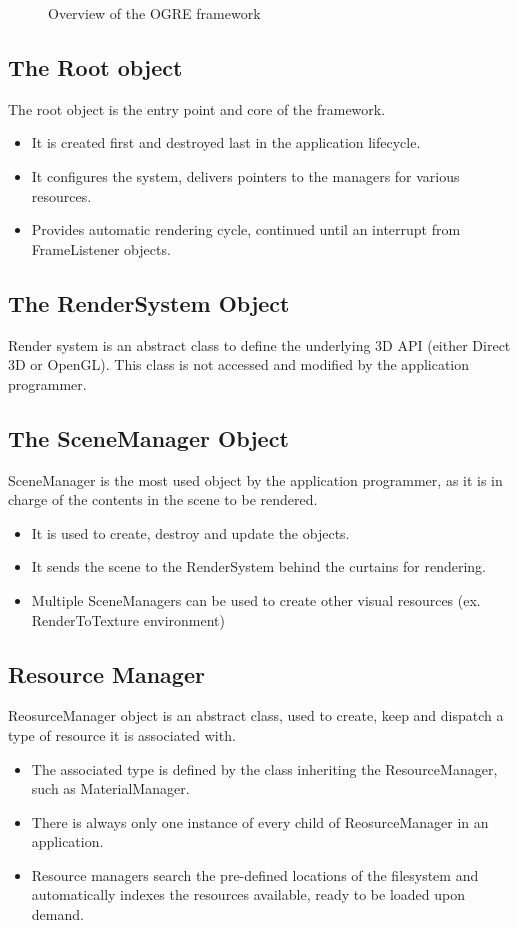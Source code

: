 \begin{figure}[h]
\centerline{}
\caption{Overview of the OGRE framework}
\label{fig:ogre-class-diagram}
\end{figure}

\subsection{The Root object}
The root object is the entry point and core of the framework.
\begin{itemize}
\item It is created first and destroyed last in the application lifecycle. 
\item It configures the system, delivers pointers to the managers for various resources.
\item Provides automatic rendering cycle, continued until an interrupt from FrameListener objects.
\end{itemize}

\subsection{The RenderSystem Object}
Render system is an abstract class to define the underlying 3D API (either Direct 3D or OpenGL). This class is not accessed and modified by the application programmer.

\subsection{The SceneManager Object}
SceneManager is the most used object by the application programmer, as it is in charge of the contents in the scene to be rendered.
\begin{itemize}
\item It is used to create, destroy and update the objects.
\item It sends the scene to the RenderSystem behind the curtains for rendering.
\item Multiple SceneManagers can be used to create other visual resources (ex. RenderToTexture environment)
\end{itemize}

\subsection{Resource Manager}
ReosurceManager object is an abstract class, used to create, keep and dispatch a type of resource it is associated with. 
\begin{itemize}
\item The associated type is defined by the class inheriting the ResourceManager, such as MaterialManager.
\item There is always only one instance of every child of ReosurceManager in an application.
\item Resource managers search the pre-defined locations of the filesystem and automatically indexes the resources available, ready to be loaded upon demand.
\end{itemize}


